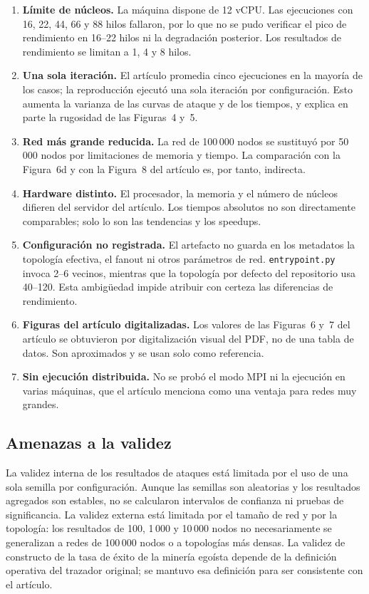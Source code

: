 \documentclass[11pt,a4paper,oneside]{article}
\begin{document}
\begin{enumerate}
  \item \textbf{Límite de núcleos.} La máquina dispone de 12 vCPU. Las ejecuciones con 16, 22, 44, 66 y 88 hilos fallaron, por lo que no se pudo verificar el pico de rendimiento en 16--22 hilos ni la degradación posterior. Los resultados de rendimiento se limitan a 1, 4 y 8 hilos.
  \item \textbf{Una sola iteración.} El artículo promedia cinco ejecuciones en la mayoría de los casos; la reproducción ejecutó una sola iteración por configuración. Esto aumenta la varianza de las curvas de ataque y de los tiempos, y explica en parte la rugosidad de las Figuras~4 y~5.
  \item \textbf{Red más grande reducida.} La red de 100\,000 nodos se sustituyó por 50\,000 nodos por limitaciones de memoria y tiempo. La comparación con la Figura~6d y con la Figura~8 del artículo es, por tanto, indirecta.
  \item \textbf{Hardware distinto.} El procesador, la memoria y el número de núcleos difieren del servidor del artículo. Los tiempos absolutos no son directamente comparables; solo lo son las tendencias y los speedups.
  \item \textbf{Configuración no registrada.} El artefacto no guarda en los metadatos la topología efectiva, el fanout ni otros parámetros de red. \texttt{entrypoint.py} invoca 2--6 vecinos, mientras que la topología por defecto del repositorio usa 40--120. Esta ambigüedad impide atribuir con certeza las diferencias de rendimiento.
  \item \textbf{Figuras del artículo digitalizadas.} Los valores de las Figuras~6 y~7 del artículo se obtuvieron por digitalización visual del PDF, no de una tabla de datos. Son aproximados y se usan solo como referencia.
  \item \textbf{Sin ejecución distribuida.} No se probó el modo MPI ni la ejecución en varias máquinas, que el artículo menciona como una ventaja para redes muy grandes.
\end{enumerate}

\subsection{Amenazas a la validez}

La validez interna de los resultados de ataques está limitada por el uso de una sola semilla por configuración. Aunque las semillas son aleatorias y los resultados agregados son estables, no se calcularon intervalos de confianza ni pruebas de significancia. La validez externa está limitada por el tamaño de red y por la topología: los resultados de 100, 1\,000 y 10\,000 nodos no necesariamente se generalizan a redes de 100\,000 nodos o a topologías más densas. La validez de constructo de la tasa de éxito de la minería egoísta depende de la definición operativa del trazador original; se mantuvo esa definición para ser consistente con el artículo.
\end{document}
